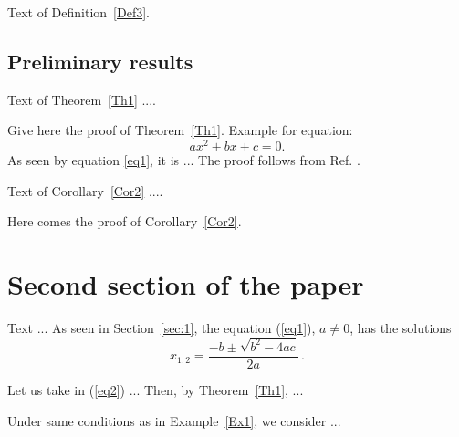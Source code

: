 \documentclass[twoside,reqno,11pt]{fcaa-var} %
\begin{document}
 \begin{definition}\label{Def3}
Text of Definition~\ref{Def3}.
 \end{definition}

   \vspace*{-12pt} %
 \subsection{Preliminary results}\label{subsec:1.1}

 \begin{theorem}\label{Th1}
Text of Theorem~\ref{Th1} ....
 \end{theorem}

 \proof %
 Give here the proof of Theorem~\ref{Th1}. Example for
equation:
\begin{equation}\label{eq1}
ax^2+bx +c =0.
\end{equation}
 As seen by equation \eqref{eq1}, it is ...
 The proof follows from Ref. \cite{Moak}.
 \proofend %

 \begin{corollary}\label{Cor2}
Text of Corollary~\ref{Cor2} ....
 \end{corollary}

 \proof
 Here comes the proof of Corollary~\ref{Cor2}.
 \proofend

\section{Second section of the paper}\label{sec:2}

\setcounter{section}{2}
\setcounter{equation}{0}\setcounter{theorem}{0}


 Text ... As seen in Section~\ref{sec:1}, the equation
(\ref{eq1}), $ a\neq 0$, has the solutions
 \begin{equation}\label{eq2}
 x_{1,2}= {\frac {-b \pm \sqrt{b^2-4ac}}{2a}}\,.
 \end{equation}

 \begin{example}\label{Ex1}
 Let us take in (\ref{eq2}) ... Then, by Theorem~\ref{Th1}, ...
 \end{example}

 \begin{example}\label{Ex2}
 Under same conditions as in Example~\ref{Ex1}, we consider ...
 \end{example}
\end{document}
